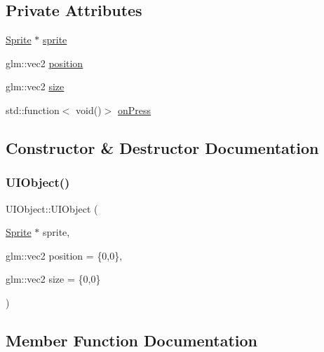 \subsection*{Private Attributes}
\begin{DoxyCompactItemize}
\item 
\hyperlink{class_sprite}{Sprite} $\ast$ \hyperlink{class_u_i_object_a20929a89f31c811f44de45e2116bfed3}{sprite}
\item 
glm\+::vec2 \hyperlink{class_u_i_object_a6a16576616e633af2f212624ecc6cb45}{position}
\item 
glm\+::vec2 \hyperlink{class_u_i_object_a8aff4ab7d58367300405639712ade234}{size}
\item 
std\+::function$<$ void()$>$ \hyperlink{class_u_i_object_a3b5769b006ba810dd1d27e71f6b4dd0a}{on\+Press}
\end{DoxyCompactItemize}


\subsection{Constructor \& Destructor Documentation}
\mbox{\label{class_u_i_object_a3d8e551cf42792f5e71e7d38733c03e5}} 
\subsubsection{\texorpdfstring{U\+I\+Object()}{UIObject()}}
{\footnotesize\ttfamily U\+I\+Object\+::\+U\+I\+Object (\begin{DoxyParamCaption}\item[{\hyperlink{class_sprite}{Sprite} $\ast$}]{sprite,  }\item[{glm\+::vec2}]{position = {\ttfamily \{0,0\}},  }\item[{glm\+::vec2}]{size = {\ttfamily \{0,0\}} }\end{DoxyParamCaption})}



\subsection{Member Function Documentation}
\mbox{\label{class_u_i_object_a45fc2fda01918da9ffb3c3c26d955e5a}} 
